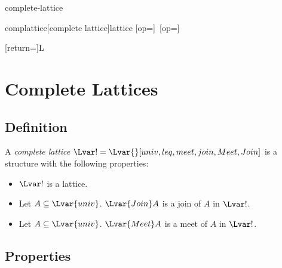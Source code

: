 \documentclass{stex}
\begin{document}
\begin{smodule}{complete-lattice}

  \STEXexport{
    \let\Join\relax
  }

  \begin{extstructure}{complattice}[complete lattice]{lattice}
    [op=\bigvee]{\bigvee\,}
    [op=\bigwedge]{\bigwedge\,}
  \end{extstructure}

  [return={\complattice[comp=##1]}]{\mathcal L}

  \section{Complete Lattices}

  \begin{forthel}
  \end{forthel}
  
  \subsection{Definition}

  \begin{forthel}
    \begin{signature*}
      A \emph{complete lattice $\Lvar! = \Lvar{}[univ,leq,meet,join,Meet,Join]$} is a structure with the following properties:

      \begin{itemize}
        \item \label{compLatticeSig}
          $\Lvar!$ is a lattice.

        \item \label{compLatticeJoinSig}
          Let $A \subseteq \Lvar{univ}$.
          ${\Lvar{Join}} A$ is a join of $A$ in $\Lvar!$.

        \item \label{compLatticeMeetSig}
          Let $A \subseteq \Lvar{univ}$.
          ${\Lvar{Meet}} A$ is a meet of $A$ in $\Lvar!$.
      \end{itemize}
    \end{signature*}
  \end{forthel}

  \subsection{Properties}


\end{smodule}
\end{document}
